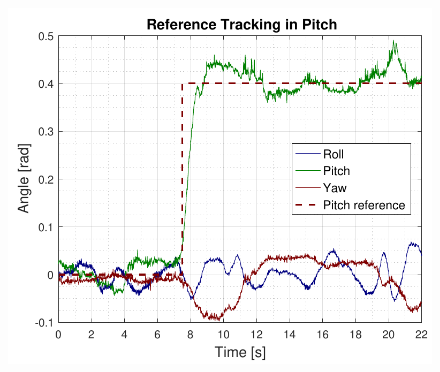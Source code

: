 \begin{figure}[H]
    \includegraphics[scale=.7]{figures/AccepttestRefTrackPitch.pdf}
    \centering			
    \label{fig:AccepttestRefTrackPitch}
\end{figure}

